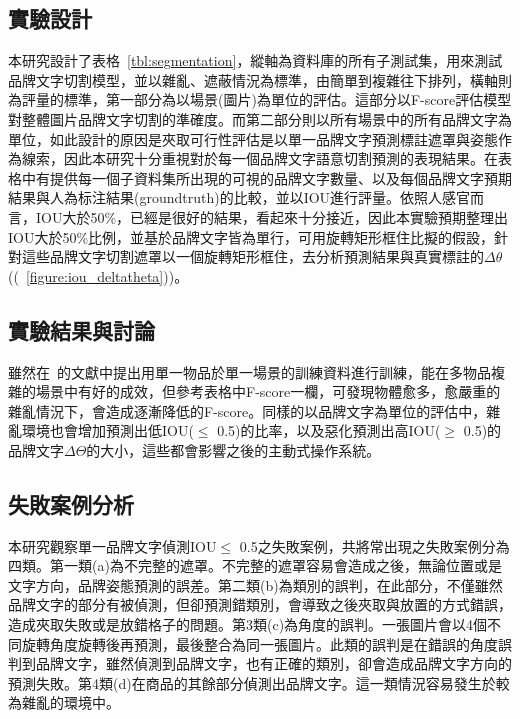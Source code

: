 \subsection{實驗設計}



本研究設計了表格~\ref{tbl:segmentation}，縱軸為資料庫的所有子測試集，用來測試品牌文字切割模型，並以雜亂、遮蔽情況為標準，由簡單到複雜往下排列，橫軸則為評量的標準，第一部分為以場景(圖片)為單位的評估。這部分以F-score評估模型對整體圖片品牌文字切割的準確度。而第二部分則以所有場景中的所有品牌文字為單位，如此設計的原因是夾取可行性評估是以單一品牌文字預測標註遮罩與姿態作為線索，因此本研究十分重視對於每一個品牌文字語意切割預測的表現結果。在表格中有提供每一個子資料集所出現的可視的品牌文字數量、以及每個品牌文字預期結果與人為标注結果(groundtruth)的比較，並以IOU進行評量。依照人感官而言，IOU大於50\%，已經是很好的結果，看起來十分接近，因此本實驗預期整理出IOU大於50\%比例，並基於品牌文字皆為單行，可用旋轉矩形框住比擬的假設，針對這些品牌文字切割遮罩以一個旋轉矩形框住，去分析預測結果與真實標註的$\Delta\theta$((~\ref{figure:iou_deltatheta}))。

\subsection{實驗結果與討論}
雖然在~\cite{zeng2016multi}的文獻中提出用單一物品於單一場景的訓練資料進行訓練，能在多物品複雜的場景中有好的成效，但參考表格中F-score一欄，可發現物體愈多，愈嚴重的雜亂情況下，會造成逐漸降低的F-score。同樣的以品牌文字為單位的評估中，雜亂環境也會增加預測出低IOU($ \le$ 0.5)的比率，以及惡化預測出高IOU($ \ge$  0.5)的品牌文字$\Delta\Theta$的大小，這些都會影響之後的主動式操作系統。

\subsection{失敗案例分析}
本研究觀察單一品牌文字偵測IOU$ \le$ 0.5之失敗案例，共將常出現之失敗案例分為四類。第一類(a)為不完整的遮罩。不完整的遮罩容易會造成之後，無論位置或是文字方向，品牌姿態預測的誤差。第二類(b)為類別的誤判，在此部分，不僅雖然品牌文字的部分有被偵測，但卻預測錯類別，會導致之後夾取與放置的方式錯誤，造成夾取失敗或是放錯格子的問題。第3類(c)為角度的誤判。一張圖片會以4個不同旋轉角度旋轉後再預測，最後整合為同一張圖片。此類的誤判是在錯誤的角度誤判到品牌文字，雖然偵測到品牌文字，也有正確的類別，卻會造成品牌文字方向的預測失敗。第4類(d)在商品的其餘部分偵測出品牌文字。這一類情況容易發生於較為雜亂的環境中。

